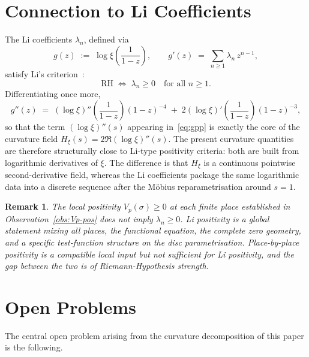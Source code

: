 \documentclass[11pt]{article}
\newtheorem*{remark}{Remark}
\newcommand{\Hxi}{H_{\xi}}
\begin{document}
\section{Connection to Li Coefficients}
\label{sec:li-comparison}

The Li coefficients $\lambda_n$, defined via
\[
g(z)\;:=\;\log\xi\!\left(\frac{1}{1-z}\right),
\qquad
g'(z)\;=\;\sum_{n\ge 1}\lambda_n\,z^{n-1},
\]
satisfy Li's criterion~\cite{Li}:
\[
\mathrm{RH}\;\Longleftrightarrow\;
\lambda_n\ge 0\quad\text{for all }n\ge 1.
\]
Differentiating once more,
\begin{equation}\label{eq:gpp}
g''(z)\;=\;(\log\xi)''\!\left(\frac{1}{1-z}\right)(1-z)^{-4}
\;+\;2(\log\xi)'\!\left(\frac{1}{1-z}\right)(1-z)^{-3},
\end{equation}
so that the term $(\log\xi)''(s)$ appearing in~\eqref{eq:gpp}
is exactly the core of the curvature field
$\Hxi(s)=2\Re(\log\xi)''(s)$.
The present curvature quantities are therefore structurally
close to Li-type positivity criteria: both are built from
logarithmic derivatives of $\xi$.
The difference is that $\Hxi$ is a continuous pointwise
second-derivative field, whereas the Li coefficients package
the same logarithmic data into a discrete sequence after the
M\"obius reparametrisation around $s=1$.

\begin{remark}
The local positivity $V_p(\sigma)\ge 0$ at each finite place
established in Observation~\ref{obs:Vp-pos} does \emph{not} imply
$\lambda_n\ge 0$.
Li positivity is a global statement mixing all places, the
functional equation, the complete zero geometry, and a
specific test-function structure on the disc parametrisation.
Place-by-place positivity is a compatible local input but not
sufficient for Li positivity, and the gap between the two is
of Riemann-Hypothesis strength.
\end{remark}

\section{Open Problems}
\label{sec:open}

The central open problem arising from the curvature
decomposition of this paper is the following.
\end{document}
